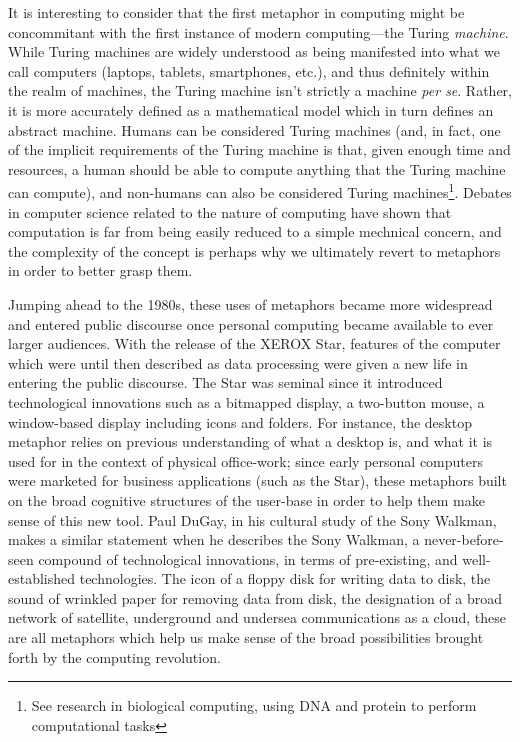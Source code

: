 \documentclass{article}
\begin{document}
It is interesting to consider that the first metaphor in computing might be concommitant with the first instance of modern computing—the Turing \emph{machine}. While Turing machines are widely understood as being manifested into what we call computers (laptops, tablets, smartphones, etc.), and thus definitely within the realm of machines, the Turing machine isn't strictly a machine \emph{per se}. Rather, it is more accurately defined as a mathematical model which in turn defines an abstract machine. Humans can be considered Turing machines (and, in fact, one of the implicit requirements of the Turing machine is that, given enough time and resources, a human should be able to compute anything that the Turing machine can compute), and non-humans can also be considered Turing machines\footnote{See research in biological computing, using DNA and protein to perform computational tasks}. Debates in computer science related to the nature of computing\cite{rapaport_philosophy_2005} have shown that computation is far from being easily reduced to a simple mechnical concern, and the complexity of the concept is perhaps why we ultimately revert to metaphors in order to better grasp them.

Jumping ahead to the 1980s, these uses of metaphors became more widespread and entered public discourse once personal computing became available to ever larger audiences. With the release of the XEROX Star, features of the computer which were until then described as data processing were given a new life in entering the public discourse. The Star was seminal since it introduced technological innovations such as a bitmapped display, a two-button mouse, a window-based display including icons and folders. For instance, the desktop metaphor relies on previous understanding of what a desktop is, and what it is used for in the context of physical office-work; since early personal computers were marketed for business applications (such as the Star), these metaphors built on the broad cognitive structures of the user-base in order to help them make sense of this new tool. Paul DuGay, in his cultural study of the Sony Walkman, makes a similar statement when he describes the Sony Walkman, a never-before-seen compound of technological innovations, in terms of pre-existing, and well-established technologies\cite{gay_doing_2013}. The icon of a floppy disk for writing data to disk, the sound of wrinkled paper for removing data from disk, the designation of a broad network of satellite, underground and undersea communications as a cloud, these are all metaphors which help us make sense of the broad possibilities brought forth by the computing revolution.
\end{document}
